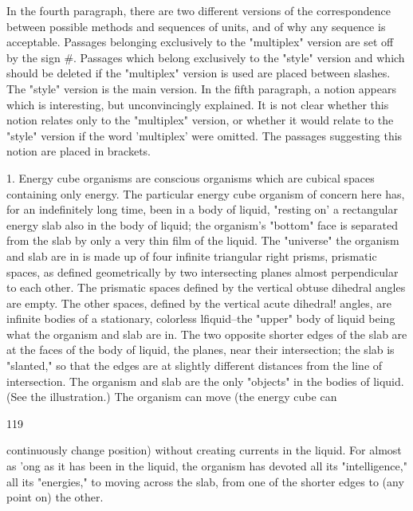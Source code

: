\documentclass[10pt,twoside]{memoir}
\begin{document}
\begin{enumerate}
{\begin{enumerate}
\begin{sysrules}
\begin{sysrules}
\begin{sysrules}
\begin{sysrules}
{\begin{enumerate}
In the fourth paragraph, there are two different versions of the 
correspondence between possible methods and sequences of units, and of 
why any sequence is acceptable. Passages belonging exclusively to the 
"multiplex" version are set off by the sign #. Passages which belong 
exclusively to the "style" version and which should be deleted if the 
"multiplex" version is used are placed between slashes. The "style" version is 
the main version. In the fifth paragraph, a notion appears which is 
interesting, but unconvincingly explained. It is not clear whether this notion 
relates only to the "multiplex" version, or whether it would relate to the 
"style" version if the word 'multiplex' were omitted. The passages suggesting 
this notion are placed in brackets. 


1. Energy cube organisms are conscious organisms which are cubical 
spaces containing only energy. The particular energy cube organism of 
concern here has, for an indefinitely long time, been in a body of liquid, 
"resting on' a rectangular energy slab also in the body of liquid; the 
organism's "bottom" face is separated from the slab by only a very thin film 
of the liquid. The "universe" the organism and slab are in is made up of four 
infinite triangular right prisms, prismatic spaces, as defined geometrically by 
two intersecting planes almost perpendicular to each other. The prismatic 
spaces defined by the vertical obtuse dihedral angles are empty. The other 
spaces, defined by the vertical acute dihedral! angles, are infinite bodies of a 
stationary, colorless lfiquid--the "upper" body of liquid being what the 
organism and slab are in. The two opposite shorter edges of the slab are at 
the faces of the body of liquid, the planes, near their intersection; the slab is 
"slanted," so that the edges are at slightly different distances from the line 
of intersection. The organism and slab are the only "objects" in the bodies 
of liquid. (See the illustration.) The organism can move (the energy cube can 


119 


continuously change position) without creating currents in the liquid. For 
almost as 'ong as it has been in the liquid, the organism has devoted all its 
"intelligence," all its "energies," to moving across the slab, from one of the 
shorter edges to (any point on) the other. 


\end{enumerate}}
\end{sysrules}
\end{sysrules}
\end{sysrules}
\end{sysrules}
\end{enumerate}}
\end{enumerate}
\end{document}
